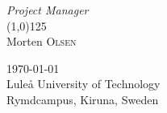 \begin{titlepage}
\begin{center}
\vspace{1cm}

\begin{flushleft} \large
\emph{Project Manager}\\
\vspace{-1.2em}
\line(1,0){125}\\
Morten \textsc{Olsen}
\end{flushleft}

\vfill

\begin{large}
\today \\
Lule\r{a} University of Technology \\
Rymdcampus, Kiruna, Sweden\\
\end{large}

\end{center}

\end{titlepage}